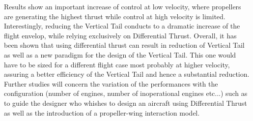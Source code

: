 \documentclass[conf]{new-aiaa} %
\begin{document}
Results show an important increase of control at low velocity, where propellers are generating the highest thrust while control at high velocity is limited. Interestingly, reducing the Vertical Tail conducts to a dramatic increase of the flight envelop, while relying exclusively on Differential Thrust. Overall, it has been shown that using differential thrust can result in reduction of Vertical Tail as well as a new paradigm for the design of the Vertical Tail. This one would have to be sized for a different flight case most probably at higher velocity, assuring a better efficiency of the Vertical Tail and hence a substantial reduction.
Further studies will concern the variation of the performances with the configuration (number of engines, number of inoperational engines etc...) such as to guide the designer who whishes to design an aircraft using Differential Thrust as well as the introduction of a propeller-wing interaction model.

\end{document}
